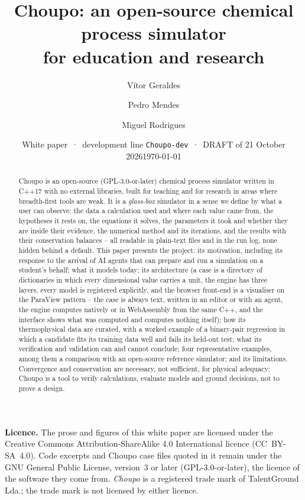 \documentclass[11pt,a4paper]{article}
\title{\textbf{Choupo: an open-source chemical process simulator\\
  for education and research}}
\author{Vítor Geraldes \and Pedro Mendes \and Miguel Rodrigues}
\date{White paper \,·\, development line \texttt{Choupo-dev}
  \,·\, \ifdraft DRAFT of 21 October 2026\else\today\fi}
\begin{document}
\maketitle
\thispagestyle{empty}

\begin{center}
\begin{minipage}{0.88\linewidth}\small
\noindent\textbf{Licence.}  The prose and figures of this white paper are
licensed under the Creative Commons Attribution-ShareAlike 4.0 International
licence (CC~BY-SA~4.0).  Code excerpts and Choupo case files quoted in it
remain under the GNU General Public License, version~3 or later
(GPL-3.0-or-later), the licence of the software they come from.
\emph{Choupo} is a registered trade mark of TalentGround Lda.; the
trade mark is not licensed by either licence.
\end{minipage}
\end{center}

\begin{abstract}
\noindent
Choupo is an open-source (GPL-3.0-or-later) chemical process simulator written
in C++17 with no external libraries, built for teaching and for research in
areas where breadth-first tools are weak.  It is a \emph{glass-box}
simulator in a sense we define by what a user can observe: the data a
calculation used and where each value came from, the hypotheses it rests on,
the equations it solves, the parameters it took and whether they are inside
their evidence, the numerical method and its iterations, and the results
with their conservation balances -- all readable in plain-text files and in
the run log, none hidden behind a default.  This paper presents the project:
its motivation, including its response to the arrival of AI agents that can
prepare and run a simulation on a student's behalf; what it models today;
its architecture (a case is a directory of dictionaries in which every
dimensional value carries a unit, the engine has three layers, every model
is registered explicitly, and the browser front-end is a visualiser on the
ParaView pattern -- the case is always text, written in an editor or with
an agent, the engine computes natively or in WebAssembly from the same C++,
and the interface shows what was computed and computes nothing itself); how
its thermophysical data are curated, with a worked example of
a binary-pair regression in which a candidate fits its training data well
and fails its held-out test; what its verification and validation can and
cannot conclude; four representative examples, among them a comparison with
an open-source reference simulator; and its limitations.  Convergence and
conservation are necessary, not sufficient, for physical adequacy: Choupo
is a tool to verify calculations, evaluate models and ground decisions, not
to prove a design.
\end{abstract}
\end{document}
